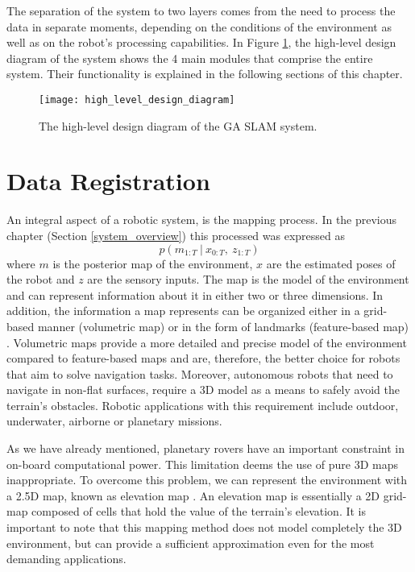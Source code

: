 The separation of the system to two layers comes from the need to process the
data in separate moments, depending on the conditions of the environment as
well as on the robot's processing capabilities.
In Figure \ref{fig:HLD}, the high-level design diagram of the system shows
the 4 main modules that comprise the entire system.
Their functionality is explained in the following sections of this chapter.

\begin{figure}[h!]
    \centering
    \texttt{[image: high\_level\_design\_diagram]}
    \decoRule
    \caption[High level design diagram]{
        The high-level design diagram of the GA SLAM system.
    }
    \label{fig:HLD}
\end{figure}

\section{Data Registration}

An integral aspect of a robotic system, is the mapping process.
In the previous chapter (Section \ref{system_overview}) this processed
was expressed as
\begin{equation}
    p(m_{1:T} \ | \ x_{0:T} ,\ z_{1:T})
\end{equation}
where
$m$ is the posterior map of the environment,
$x$ are the estimated poses of the robot and
$z$ are the sensory inputs.
The map is the model of the environment and can represent information about
it in either two or three dimensions.
In addition, the information a map represents can be organized either in
a grid-based manner (volumetric map) or in the form of landmarks
(feature-based map) \parencite{Jefferies2008}.
Volumetric maps provide a more detailed and precise model of the environment
compared to feature-based maps and are, therefore, the better choice for
robots that aim to solve navigation tasks.
Moreover, autonomous robots that need to navigate in non-flat surfaces,
require a 3D model as a means to safely avoid the terrain's obstacles.
Robotic applications with this requirement include outdoor, underwater,
airborne or planetary missions.

As we have already mentioned, planetary rovers have an important constraint
in on-board computational power.
This limitation deems the use of pure 3D maps inappropriate.
To overcome this problem, we can represent the environment with a 2.5D map,
known as elevation map \parencite{Cremean2005}.
An elevation map is essentially a 2D grid-map composed of cells that hold
the value of the terrain's elevation.
It is important to note that this mapping method does not model completely
the 3D environment, but can provide a sufficient approximation even for
the most demanding applications.

